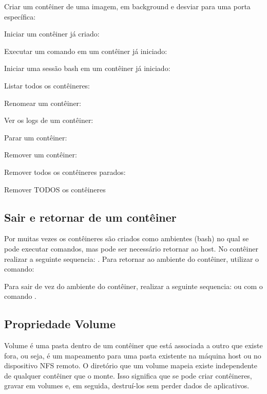 \documentclass[a4paper,11pt]{article}
\begin{document}
Criar um contêiner de uma imagem, em background e desviar para uma porta específica: \\

Iniciar um contêiner já criado: \\

Executar um comando em um contêiner já iniciado: \\

Iniciar uma sessão bash em um contêiner já iniciado: \\

Listar todos os contêineres: \\

Renomear um contêiner: \\

Ver os logs de um contêiner: \\

Parar um contêiner: \\

Remover um contêiner: \\

Remover todos os contêineres parados: \\

Remover TODOS os contêineres \\

\subsection{Sair e retornar de um contêiner}
Por muitas vezes os contêineres são criados como ambientes (bash) no qual se pode executar comandos, mas pode ser necessário retornar ao host. No contêiner realizar a seguinte sequencia: . Para retornar ao ambiente do contêiner, utilizar o comando: \\

Para sair de vez do ambiente do contêiner, realizar a seguinte sequencia: 
 ou com o comando .

\subsection{Propriedade Volume}
Volume é uma pasta dentro de um contêiner que está associada a outro que existe fora, ou seja, é um mapeamento para uma pasta existente na máquina host ou no dispositivo NFS remoto. O diretório que um volume mapeia existe independente de qualquer contêiner que o monte. Isso significa que se pode criar contêineres, gravar em volumes e, em seguida, destruí-los sem perder dados de aplicativos.
\end{document}
